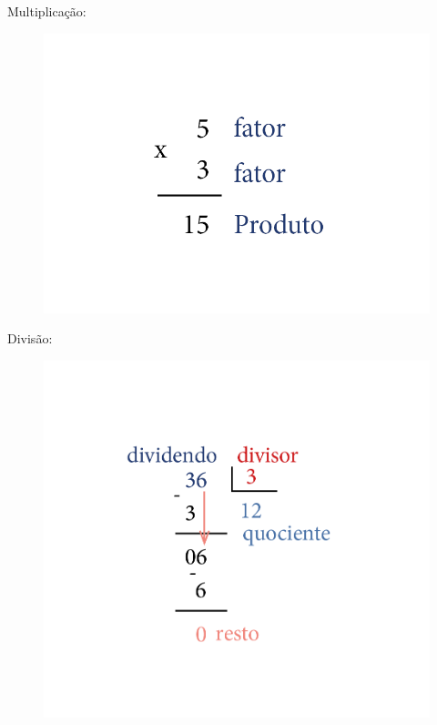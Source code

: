 {Multiplicação:

\begin{figure}[htpb!]
\includegraphics[width=\textwidth]{../ilustracoes/MAT5/SAEB_5ANO_MAT_figura16.png}
\end{figure}

Divisão:

\begin{figure}[htpb!]
\includegraphics[width=\textwidth]{../ilustracoes/MAT5/SAEB_5ANO_MAT_figura17.png}
\end{figure}
}

